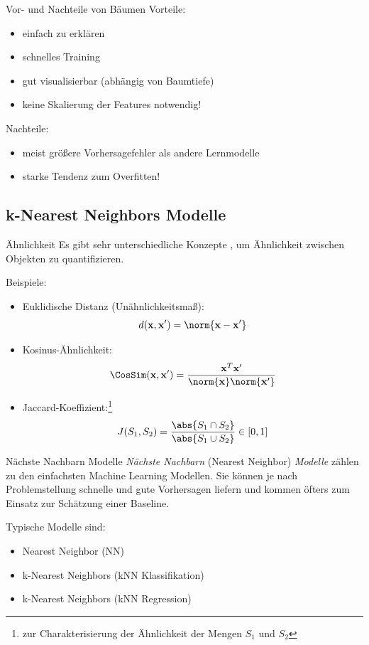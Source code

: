 \begin{bonus}{Vor- und Nachteile von Bäumen}
    Vorteile:
    \begin{itemize}
        \item einfach zu erklären
        \item schnelles Training
        \item gut visualisierbar (abhängig von Baumtiefe)
        \item keine Skalierung der Features notwendig!
    \end{itemize}

    Nachteile:
    \begin{itemize}
        \item meist größere Vorhersagefehler als andere Lernmodelle
        \item starke Tendenz zum Overfitten!
    \end{itemize}
\end{bonus}

\subsection{k-Nearest Neighbors Modelle}

\begin{defi}{Ähnlichkeit}
    Es gibt sehr unterschiedliche Konzepte , um Ähnlichkeit zwischen Objekten zu quantifizieren.

    Beispiele:
    \begin{itemize}
        \item Euklidische Distanz (Unähnlichkeitsmaß):
              \[
                  d(\mathbf{x}, \mathbf{x}') = \norm{\mathbf{x} - \mathbf{x}'}
              \]
        \item Kosinus-Ähnlichkeit:
              \[
                  \CosSim(\mathbf{x}, \mathbf{x}') = \frac{\mathbf{x}^T \mathbf{x}'}{\norm{\mathbf{x}} \norm{\mathbf{x}'}}
              \]
        \item Jaccard-Koeffizient:\footnote{zur Charakterisierung der Ähnlichkeit der Mengen $S_1$ und $S_2$}
              \[
                  J(S_1, S_2) = \frac{\abs{S_1 \cap S_2}}{\abs{S_1 \cup S_2}} \in [0, 1]
              \]
    \end{itemize}
\end{defi}

\begin{defi}{Nächste Nachbarn Modelle}
    \emph{Nächste Nachbarn} (Nearest Neighbor) \emph{Modelle} zählen zu den einfachsten Machine Learning Modellen.
    Sie können je nach Problemstellung schnelle und gute Vorhersagen liefern und kommen öfters zum Einsatz zur Schätzung einer Baseline.

    Typische Modelle sind:
    \begin{itemize}
        \item Nearest Neighbor (NN)
        \item k-Nearest Neighbors (kNN Klassifikation)
        \item k-Nearest Neighbors (kNN Regression)
    \end{itemize}
\end{defi}

